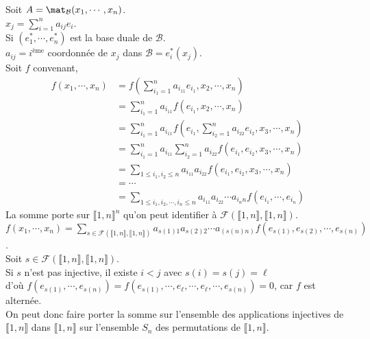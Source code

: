 \documentclass[12pt,a4paper]{report}
\begin{document}
\begin{demo}{}
Soit $A = \mat_{\mathcal{B}}(x_1,\cdots,x_n)$. \\
$x_j = \displaystyle{\sum_{i=1}^n a_{ij}e_i}$. \\
Si $(e^*_1,\cdots,e^*_n)$ est la base duale de $\mathcal{B}$.  \\
$a_{ij} = i^{\text{ème}}$ coordonnée de $x_j$ dans $\mathcal{B} = e^*_i(x_j)$. \\

Soit $f$ convenant, 
\begin{align*}
f(x_1,\cdots,x_n) &= f\left(\sum_{i_1=1}^n a_{i_11}e_{i_1},x_2,\cdots,x_n\right) \\
&= \sum_{i_1=1}^n a_{i_11}f(e_{i_1},x_2,\cdots,x_n)\\
&= \sum_{i_1=1}^na_{i_11}f\left(e_{i_1},\sum_{i_2=1}^na_{i_22}e_{i_2},x_3,\cdots,x_n \right) \\
&= \sum_{i_1=1}^n a_{i_11} \sum_{i_2=1}^n a_{i_22} f(e_{i_1},e_{i_2},x_3,\cdots,x_n) \\
&= \sum_{1 \le i_1,i_2 \le n}a_{i_11}a_{i_22} f(e_{i_1},e_{i_2},x_3,\cdots,x_n) \\
&= \cdots \\
&= \sum_{1 \le i_1,i_2,\cdots,i_n  \le n} a_{i_11}a_{i_22}\cdots a_{i_nn}f(e_{i_1},\cdots,e_{i_n})
\end{align*}
La somme porte sur $\llbracket 1,n \rrbracket ^n$ qu'on peut identifier à $\mathcal{F}(\llbracket 1,n \rrbracket,\llbracket 1,n \rrbracket)$. \\

$f(x_1,\cdots,x_n) = \displaystyle{\sum_{s \in \mathcal{F}(\llbracket 1,n \rrbracket,\llbracket 1,n \rrbracket)} a_{s(1)1}a_{s(2)2}\cdots a_({s(n)}n) f(e_{s(1)},e_{s(2)},\cdots,e_{s(n)})}$. \\

Soit $s \in \mathcal{F}(\llbracket 1,n \rrbracket,\llbracket 1,n \rrbracket)$. \\
Si $s$ n'est pas injective, il existe $i < j$ avec $s(i) = s(j) = \ell$ \\
d'où $f(e_{s(1)},\cdots,e_{s(n)}) = f(e_{s(1)},\cdots,e_\ell,\cdots,e_\ell,\cdots,e_{s(n)}) = 0$, car $f$ est alternée. \\

On peut donc faire porter la somme sur l'ensemble des applications injectives de $\llbracket 1,n \rrbracket$ dans $\llbracket 1,n \rrbracket$ \ie sur l'ensemble $S_n$ des permutations de $\llbracket 1,n \rrbracket$. \\


\end{demo}
\end{document}
